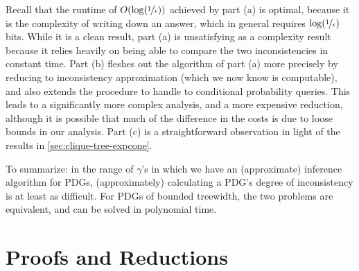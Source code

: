 Recall that the runtime of $O(\log(\nicefrac1\epsilon))$ achieved by part (a) is optimal, because it is the complexity of writing down an answer, which in general requires $\log(\nicefrac 1\epsilon)$ bits. 
While it is a clean result, part (a) is unsatisfying as a complexity result because it relies heavily on being able to compare the two inconsistencies in constant time.
Part (b) fleshes out the algorithm of part (a) more precisely 
    by reducing to inconsistency approximation (which we now know is computable), 
    and also extends the procedure to handle to conditional probability queries. 
This leads to a significantly more complex analysis, and a more expensive reduction, although it is possible that much of the difference in the costs is due to loose bounds in our analysis. 
Part (c) is a straightforward observation in light of 
    the results in \cref{sec:clique-tree-expcone}.

To summarize: in the range of $\gamma$'s in which we have an (approximate) inference algorithm for PDGs, (approximately) calculating a PDG's degree of inconsistency is at least as difficult.
For PDGs of bounded treewidth, the two problems are equivalent, and can be solved in polynomial time. 



\section{Proofs and Reductions}
    \label{proofs:the-reductions}
   
